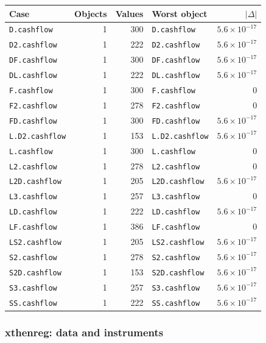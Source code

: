 \documentclass[
  10.5pt,
  a4paper,
]{article}
\begin{document}
\begin{longtable}{@{}p{3.6cm}rrp{4.9cm}r@{}}
\toprule
Case & Objects & Values & Worst object & $|\Delta|$ \\
\midrule
\endhead
\texttt{D.cashflow} & 1 & 300 & \texttt{D.cashflow} & $5.6\times10^{-17}$ \\
\texttt{D2.cashflow} & 1 & 222 & \texttt{D2.cashflow} & $5.6\times10^{-17}$ \\
\texttt{DF.cashflow} & 1 & 300 & \texttt{DF.cashflow} & $5.6\times10^{-17}$ \\
\texttt{DL.cashflow} & 1 & 222 & \texttt{DL.cashflow} & $5.6\times10^{-17}$ \\
\texttt{F.cashflow} & 1 & 300 & \texttt{F.cashflow} & 0 \\
\texttt{F2.cashflow} & 1 & 278 & \texttt{F2.cashflow} & 0 \\
\texttt{FD.cashflow} & 1 & 300 & \texttt{FD.cashflow} & $5.6\times10^{-17}$ \\
\texttt{L.D2.cashflow} & 1 & 153 & \texttt{L.D2.cashflow} & $5.6\times10^{-17}$ \\
\texttt{L.cashflow} & 1 & 300 & \texttt{L.cashflow} & 0 \\
\texttt{L2.cashflow} & 1 & 278 & \texttt{L2.cashflow} & 0 \\
\texttt{L2D.cashflow} & 1 & 205 & \texttt{L2D.cashflow} & $5.6\times10^{-17}$ \\
\texttt{L3.cashflow} & 1 & 257 & \texttt{L3.cashflow} & 0 \\
\texttt{LD.cashflow} & 1 & 222 & \texttt{LD.cashflow} & $5.6\times10^{-17}$ \\
\texttt{LF.cashflow} & 1 & 386 & \texttt{LF.cashflow} & 0 \\
\texttt{LS2.cashflow} & 1 & 205 & \texttt{LS2.cashflow} & $5.6\times10^{-17}$ \\
\texttt{S2.cashflow} & 1 & 278 & \texttt{S2.cashflow} & $5.6\times10^{-17}$ \\
\texttt{S2D.cashflow} & 1 & 153 & \texttt{S2D.cashflow} & $5.6\times10^{-17}$ \\
\texttt{S3.cashflow} & 1 & 257 & \texttt{S3.cashflow} & $5.6\times10^{-17}$ \\
\texttt{SS.cashflow} & 1 & 222 & \texttt{SS.cashflow} & $5.6\times10^{-17}$ \\
\bottomrule
\end{longtable}

\subsubsection*{xthenreg: data and instruments}
\end{document}
